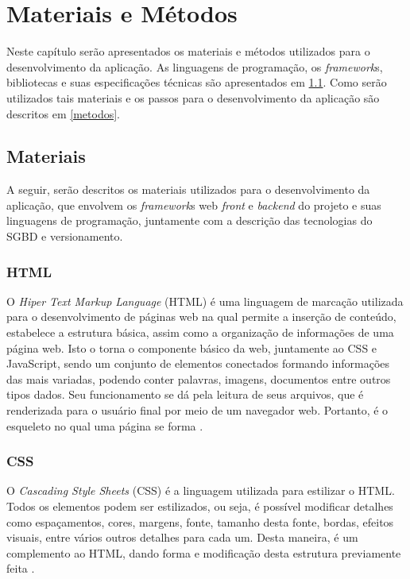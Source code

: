 \chapter{Materiais e Métodos}\label{chp:LABEL_CHP_3}
Neste capítulo serão apresentados os materiais e métodos utilizados para o desenvolvimento da aplicação. As linguagens de programação, os \textit{framework}s, bibliotecas e suas especificações técnicas são apresentados em \ref{materiais}. Como serão utilizados tais materiais e os passos para o desenvolvimento da aplicação são descritos em \ref{metodos}.

\section{Materiais} \label{materiais}
A seguir, serão descritos os materiais utilizados para o desenvolvimento da aplicação, que envolvem os \textit{framework}s web \textit{front} e \textit{backend} do projeto e suas linguagens de programação, juntamente com a descrição das tecnologias do SGBD e versionamento.

\subsection{HTML}
O \textit{Hiper Text Markup Language} (HTML) é uma linguagem de marcação utilizada para o desenvolvimento de páginas web na qual permite a inserção de conteúdo, estabelece a estrutura básica, assim como a organização de informações de uma página web. Isto o torna o componente básico da web, juntamente ao CSS e JavaScript, sendo um conjunto de elementos conectados formando informações das mais variadas, podendo conter palavras, imagens, documentos entre outros tipos dados. Seu funcionamento se dá pela leitura de seus arquivos, que é renderizada para o usuário final por meio de um navegador web. Portanto, é o esqueleto no qual uma página se forma \cite{FLANAGAN}.

\subsection{CSS}
O \textit{Cascading Style Sheets} (CSS) é a linguagem utilizada para estilizar o HTML. Todos os elementos podem ser estilizados, ou seja, é possível modificar detalhes como espaçamentos, cores, margens, fonte, tamanho desta fonte, bordas, efeitos visuais, entre vários outros detalhes para cada um. Desta maneira, é um complemento ao HTML, dando forma e modificação desta estrutura previamente feita \cite{FLANAGAN}.

